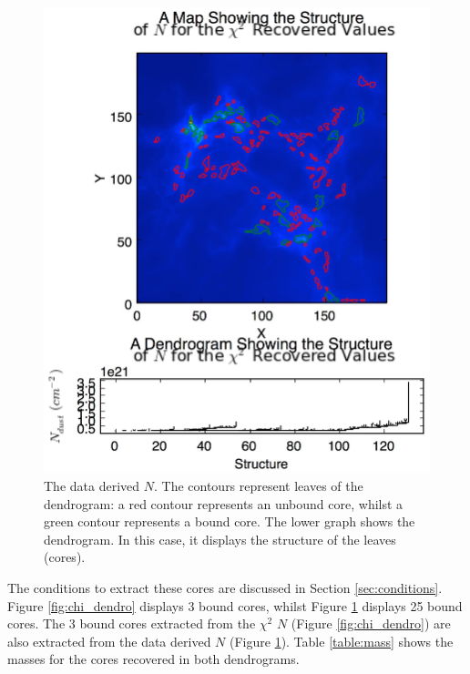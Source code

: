 \documentclass{report}
\begin{document}
\begin{figure}[H]
\endminipage\hfill
{}
  \includegraphics[width=\linewidth]{../img/N_data_inp.jpg}
  \caption{The data derived $N$. The contours represent leaves of the dendrogram: a red contour represents an unbound core, whilst a green contour represents a bound core. The lower graph shows the dendrogram. In this case, it displays the structure of the leaves (cores).}\label{fig:data_dendro}
\endminipage
\end{figure}

The conditions to extract these cores are discussed in Section \ref{sec:conditions}. Figure \ref{fig:chi_dendro} displays 3 bound cores, whilst Figure \ref{fig:data_dendro} displays 25 bound cores. The 3 bound cores extracted from the $\chi^{2}$ $N$ (Figure \ref{fig:chi_dendro}) are also extracted from the data derived $N$
(Figure \ref{fig:data_dendro}). Table \ref{table:mass} shows the masses for the cores recovered in both dendrograms.
\end{document}
